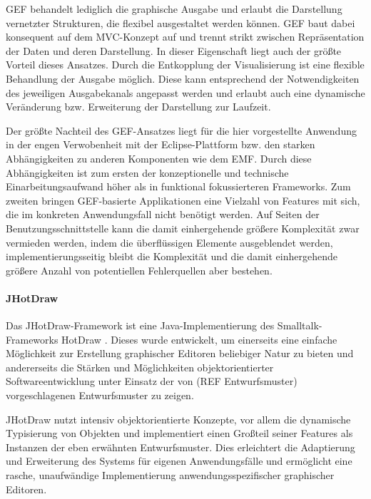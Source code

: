 \gls{GEF} behandelt lediglich die graphische Ausgabe und erlaubt die Darstellung vernetzter Strukturen, die flexibel ausgestaltet werden können. \gls{GEF} baut dabei konsequent auf dem \gls{MVC}-Konzept \citep{Krasner88} auf und trennt strikt zwischen Repräsentation der Daten und deren Darstellung. In dieser Eigenschaft liegt auch der größte Vorteil dieses Ansatzes. Durch die Entkopplung der Visualisierung ist eine flexible Behandlung der Ausgabe möglich. Diese kann entsprechend der Notwendigkeiten des jeweiligen Ausgabekanals angepasst werden und erlaubt auch eine dynamische Veränderung bzw. Erweiterung der Darstellung zur Laufzeit.

Der größte Nachteil des \gls{GEF}-Ansatzes liegt für die hier vorgestellte Anwendung in der engen Verwobenheit mit der Eclipse-Plattform bzw. den starken Abhängigkeiten zu anderen Komponenten wie dem \gls{EMF}. Durch diese Abhängigkeiten ist zum ersten der konzeptionelle und technische Einarbeitungsaufwand höher als in funktional fokussierteren Frameworks. Zum zweiten bringen GEF-basierte Applikationen eine Vielzahl von Features mit sich, die im konkreten Anwendungsfall nicht benötigt werden. Auf Seiten der Benutzungsschnittstelle kann die damit einhergehende größere Komplexität zwar vermieden werden, indem die überflüssigen Elemente ausgeblendet werden, implementierungsseitig bleibt die Komplexität und die damit einhergehende größere Anzahl von potentiellen Fehlerquellen aber bestehen.

\paragraph{JHotDraw} %
\label{par:jhotdraw}

Das JHotDraw-Framework \citep{Gamma96} ist eine Java-Implementierung des Smalltalk-Frameworks HotDraw \citep{Brant95}. Dieses wurde entwickelt, um einerseits eine einfache Möglichkeit zur Erstellung graphischer Editoren beliebiger Natur zu bieten und andererseits die Stärken und Möglichkeiten objektorientierter Softwareentwicklung unter Einsatz der von (REF Entwurfsmuster) vorgeschlagenen Entwurfsmuster zu zeigen.

JHotDraw nutzt intensiv objektorientierte Konzepte, vor allem die dynamische Typisierung von Objekten und implementiert einen Großteil seiner Features als Instanzen der eben erwähnten Entwurfsmuster. Dies erleichtert die Adaptierung und Erweiterung des Systems für eigenen Anwendungsfälle und ermöglicht eine rasche, unaufwändige Implementierung anwendungsspezifischer graphischer Editoren.

